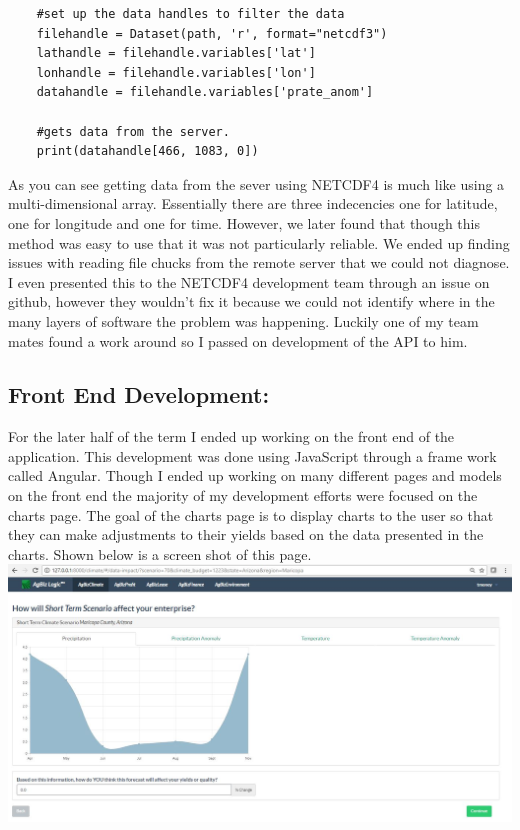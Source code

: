 \documentclass[onecolumn, draftclsnofoot,10pt, compsoc]{article}
\begin{document}
\begin{lstlisting}
	#set up the data handles to filter the data
	filehandle = Dataset(path, 'r', format="netcdf3")
	lathandle = filehandle.variables['lat']
	lonhandle = filehandle.variables['lon']
	datahandle = filehandle.variables['prate_anom']

	#gets data from the server.
	print(datahandle[466, 1083, 0])
\end{lstlisting}
		
		As you can see getting data from the sever using NETCDF4 is much like using a multi-dimensional array. Essentially there are three indecencies one for latitude, one for longitude and one for time. However, we later found that though this method was easy to use that it was not particularly reliable. We ended up finding issues with reading file chucks from the remote server that we could not diagnose. I even presented this to the NETCDF4 development team through an issue on github, however they wouldn't fix it because we could not identify where in the many layers of software the problem was happening. Luckily one of my team mates found a work around so I passed on development of the API to him.\\
	
		\subsection{Front End Development:}
		For the later half of the term I ended up working on the front end of the application. This development was done using JavaScript through a frame work called Angular. Though I ended up working on many different pages and models on the front end the majority of my development efforts were focused on the charts page. The goal of the charts page is to display charts to the user so that they can make adjustments to their yields based on the data presented in the charts. Shown below is a screen shot of this page.\\
		
		\includegraphics{Images/ChartsPage.JPG}
		
\end{document}
